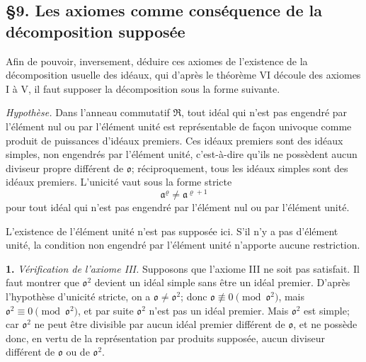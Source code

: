 \providecommand{\mR}{\mathfrak{R}}
\providecommand{\mT}{\mathfrak{T}}
\providecommand{\mK}{\mathfrak{K}}
\providecommand{\ma}{\mathfrak{a}}
\providecommand{\mb}{\mathfrak{b}}
\providecommand{\mc}{\mathfrak{c}}
\providecommand{\mm}{\mathfrak{m}}
\providecommand{\mn}{\mathfrak{n}}
\providecommand{\mo}{\mathfrak{o}}
\providecommand{\mpideal}{\mathfrak{p}}
\providecommand{\mq}{\mathfrak{q}}
\providecommand{\mt}{\mathfrak{t}}
\providecommand{\mX}{\mathfrak{X}}

\subsection*{\S{}9. Les axiomes comme conséquence de la décomposition supposée}

Afin de pouvoir, inversement, déduire ces axiomes de l'existence de la décomposition usuelle des idéaux, qui d'après le théorème VI découle des axiomes I à V, il faut supposer la décomposition sous la forme suivante.

\emph{Hypothèse.} Dans l'anneau commutatif $\mR$, tout idéal qui n'est pas engendré par l'élément nul ou par l'élément unité est représentable de façon univoque comme produit de puissances d'idéaux premiers. Ces idéaux premiers sont des idéaux simples, non engendrés par l'élément unité, c'est-à-dire qu'ils ne possèdent aucun diviseur propre différent de $\mo$; réciproquement, tous les idéaux simples sont des idéaux premiers. L'unicité vaut sous la forme stricte
\[
        \ma^\varrho\ne\ma^{\varrho+1}
\]
pour tout idéal qui n'est pas engendré par l'élément nul ou par l'élément unité.

L'existence de l'élément unité n'est pas supposée ici. S'il n'y a pas d'élément unité, la condition \og{}non engendré par l'élément unité\fg{} n'apporte aucune restriction.

\textbf{1.} \emph{Vérification de l'axiome III.} Supposons que l'axiome III ne soit pas satisfait. Il faut montrer que $\mo^2$ devient un idéal simple sans être un idéal premier. D'après l'hypothèse d'unicité stricte, on a $\mo\ne\mo^2$; donc $\mo\not\equiv0\pmod{\mo^2}$, mais $\mo^2\equiv0\pmod{\mo^2}$, et par suite $\mo^2$ n'est pas un idéal premier. Mais $\mo^2$ est simple; car $\mo^2$ ne peut être divisible par aucun idéal premier différent de $\mo$, et ne possède donc, en vertu de la représentation par produits supposée, aucun diviseur différent de $\mo$ ou de $\mo^2$.

